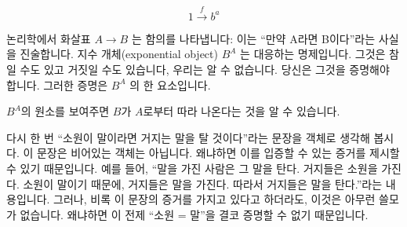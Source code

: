 \documentclass[DaoFP]{subfiles}
\begin{document}
\[ 1 \xrightarrow f b^a\]

논리학에서 화살표 $ A \to B$ 는 함의를 나타냅니다: 이는 ``만약 A라면 B이다''라는 사실을 진술합니다. 지수 개체(exponential object) $ B^A$ 는 대응하는 명제입니다. 그것은 참일 수도 있고 거짓일 수도 있습니다, 우리는 알 수 없습니다. 당신은 그것을 증명해야 합니다. 그러한 증명은 $ B^A$ 의 한 요소입니다.

$ B^A$의 원소를 보여주면 $ B$가 $ A$로부터 따라 나온다는 것을 알 수 있습니다.

다시 한 번 ``소원이 말이라면 거지는 말을 탈 것이다''라는 문장을 객체로 생각해 봅시다. 이 문장은 비어있는 객체는 아닙니다. 왜냐하면 이를 입증할 수 있는 증거를 제시할 수 있기 때문입니다. 예를 들어, ``말을 가진 사람은 그 말을 탄다. 거지들은 소원을 가진다. 소원이 말이기 때문에, 거지들은 말을 가진다. 따라서 거지들은 말을 탄다.''라는 내용입니다. 그러나, 비록 이 문장의 증거를 가지고 있다고 하더라도, 이것은 아무런 쓸모가 없습니다. 왜냐하면 이 전제 ``소원 = 말''을 결코 증명할 수 없기 때문입니다.
\end{document}
